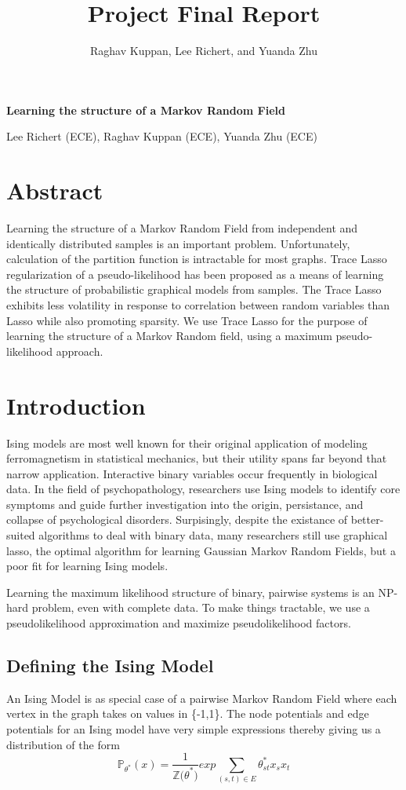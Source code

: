 \documentclass[11pt]{article}
\author{Raghav Kuppan, Lee Richert, and Yuanda Zhu}
\title{Project Final Report}
\begin{document}
\begin{center}
\textbf{\Large Learning the structure of a Markov Random Field}
\end{center}

\begin{center}
Lee Richert (ECE), Raghav Kuppan (ECE), Yuanda Zhu (ECE)
\end{center}



\section{Abstract}
Learning the structure of a Markov Random Field from independent and identically distributed samples is an important problem.
Unfortunately, calculation of the partition function is intractable for most graphs.
Trace Lasso regularization of a pseudo-likelihood has been proposed as a means of learning the structure of probabilistic graphical models from samples. 
The Trace Lasso exhibits less volatility in response to correlation between random variables than Lasso while also promoting sparsity. 
We use Trace Lasso for the purpose of learning the structure of a Markov Random field, using a maximum pseudo-likelihood approach.


\section{Introduction}

Ising models are most well known for their original application of modeling ferromagnetism in statistical mechanics, but their utility spans far beyond that narrow application.
Interactive binary variables occur frequently in biological data.
In the field of psychopathology, researchers use Ising models to identify core symptoms and guide further investigation into the origin, persistance, and collapse of psychological disorders.
Surpisingly, despite the existance of better-suited algorithms to deal with binary data, many researchers still use graphical lasso, the optimal algorithm for learning Gaussian Markov Random Fields, but a poor fit for learning Ising models.

Learning the maximum likelihood structure of binary, pairwise systems is an NP-hard problem, even with complete data.
To make things tractable, we use a pseudolikelihood approximation and maximize pseudolikelihood factors.  

\subsection{Defining the Ising Model}
An Ising Model is as special case of a pairwise Markov Random Field where each vertex in the graph takes on values in \{-1,1\}.
The node potentials and edge potentials for an Ising model have very simple expressions thereby giving us a distribution of the form
\[ \mathbb{P}_{\theta^*} (x)  =  \frac{1}{\mathbb{Z(\theta}^*)} exp { \sum\limits_{ (s,t) \in E} \theta^*_{st} x_s x_t  }   \]
\end{document}
